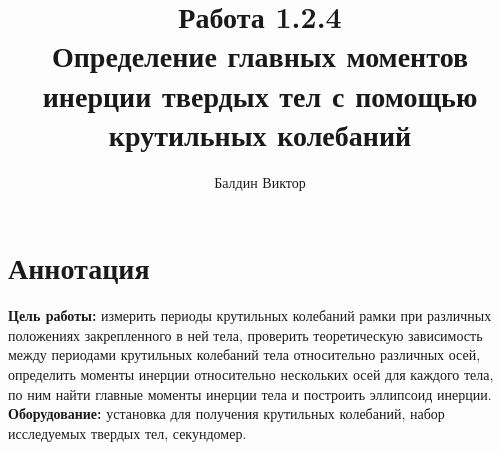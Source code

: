 \documentclass[a4paper, 12pt]{article}
\author{Балдин Виктор}
\title{Работа 1.2.4 \\ Определение главных моментов инерции твердых тел с помощью крутильных колебаний}
\begin{document}
	\maketitle
	\section{Аннотация}
	\textbf{Цель работы:} измерить периоды крутильных колебаний рамки при различных положениях закрепленного
	в ней тела, проверить теоретическую зависимость между периодами крутильных колебаний тела
	относительно различных осей, определить моменты инерции относительно нескольких осей для каждого тела,
	по ним найти главные моменты инерции тела и построить эллипсоид инерции.
	\bigskip\\
	\textbf{Оборудование:} установка для получения крутильных колебаний, набор исследуемых твердых тел, секундомер.
\end{document}

